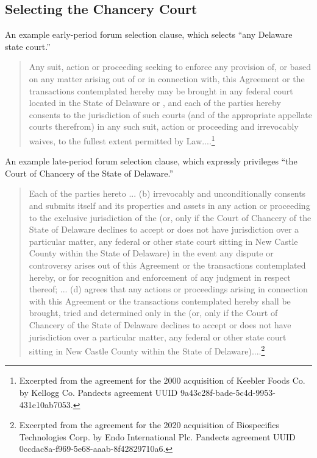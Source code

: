 \documentclass[12pt]{article}
\begin{document}
{\begin{appendices}
\subsection{Selecting the Chancery Court}
\label{app:excerpt-chancery}
An example early-period forum selection clause, which selects ``any Delaware state court.''
\begingroup
\singlespacing
\begin{quote}
  Any suit, action or proceeding seeking to enforce any provision of, or based on any matter arising out of or in connection with, this Agreement or the transactions contemplated hereby may be brought in any federal court located in the State of Delaware or , and each of the parties hereby consents to the jurisdiction of such courts (and of the appropriate appellate courts therefrom) in any such suit, action or proceeding and irrevocably waives, to the fullest extent permitted by Law....\footnote{Excerpted from the agreement for the 2000 acquisition of Keebler Foods Co. by Kellogg Co. Pandects agreement UUID 9a43c28f-bade-5c4d-9953-431e10ab7053.}
\end{quote}
\endgroup

An example late-period forum selection clause, which expressly privileges ``the Court of Chancery of the State of Delaware.''
\begingroup
\singlespacing
\begin{quote}
  Each of the parties hereto ... (b) irrevocably and unconditionally consents and submits itself and its properties and assets in any action or proceeding to the exclusive jurisdiction of the  (or, only if the Court of Chancery of the State of Delaware declines to accept or does not have jurisdiction over a particular matter, any federal or other state court sitting in New Castle County within the State of Delaware) in the event any dispute or controversy arises out of this Agreement or the transactions contemplated hereby, or for recognition and enforcement of any judgment in respect thereof; ... (d) agrees that any actions or proceedings arising in connection with this Agreement or the transactions contemplated hereby shall be brought, tried and determined only in the  (or, only if the Court of Chancery of the State of Delaware declines to accept or does not have jurisdiction over a particular matter, any federal or other state court sitting in New Castle County within the State of Delaware)....\footnote{Excerpted from the agreement for the 2020 acquisition of Biospecifics Technologies Corp. by Endo International Plc. Pandects agreement UUID 0ccdac8a-f969-5e68-aaab-8f42829710a6.}
\end{quote}
\endgroup


\end{appendices}}
\end{document}
